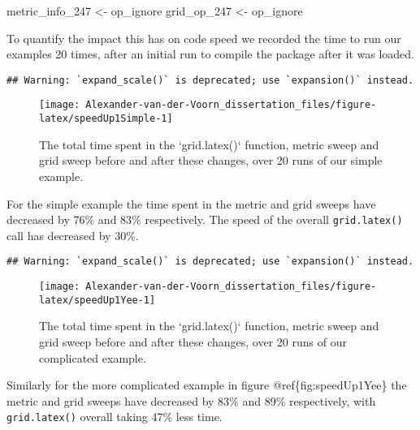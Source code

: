 \documentclass[]{article}
\newenvironment{Shaded}{\begin{snugshade}}{\end{snugshade}}
\newcommand{\DecValTok}[1]{\textcolor[rgb]{0.00,0.00,0.81}{#1}}
\newcommand{\StringTok}[1]{\textcolor[rgb]{0.31,0.60,0.02}{#1}}
\newcommand{\NormalTok}[1]{#1}
\begin{document}
\begin{Shaded}
\begin{Highlighting}[]
\NormalTok{metric_info_}\DecValTok{247}\NormalTok{ <-}\StringTok{ }\NormalTok{op_ignore}
\NormalTok{grid_op_}\DecValTok{247}\NormalTok{ <-}\StringTok{ }\NormalTok{op_ignore}
\end{Highlighting}
\end{Shaded}

To quantify the impact this has on code speed we recorded the time to
run our examples 20 times, after an initial run to compile the package
after it was loaded.

\begin{verbatim}
## Warning: `expand_scale()` is deprecated; use `expansion()` instead.
\end{verbatim}

\begin{figure}

{\centering \texttt{[image: Alexander-van-der-Voorn\_dissertation\_files/figure-latex/speedUp1Simple-1]} 

}

\caption{The total time spent in the `grid.latex()` function, metric sweep and grid sweep before and after these changes, over 20 runs of our simple example.}\label{fig:speedUp1Simple}
\end{figure}

For the simple example the time spent in the metric and grid sweeps have
decreased by 76\% and 83\% respectively. The speed of the overall
\texttt{grid.latex()} call has decreased by 30\%.

\begin{verbatim}
## Warning: `expand_scale()` is deprecated; use `expansion()` instead.
\end{verbatim}

\begin{figure}

{\centering \texttt{[image: Alexander-van-der-Voorn\_dissertation\_files/figure-latex/speedUp1Yee-1]} 

}

\caption{The total time spent in the `grid.latex()` function, metric sweep and grid sweep before and after these changes, over 20 runs of our complicated example.}\label{fig:speedUp1Yee}
\end{figure}

Similarly for the more complicated example in figure
@ref\{fig:speedUp1Yee\} the metric and grid sweeps have decreased by
83\% and 89\% respectively, with \texttt{grid.latex()} overall taking
47\% less time.
\end{document}
